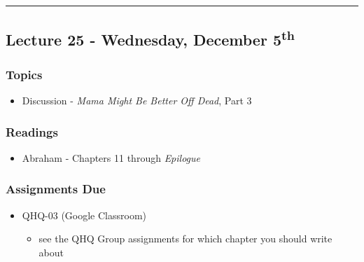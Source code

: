 \documentclass[]{book}
\providecommand{\tightlist}{%
  \setlength{\itemsep}{0pt}\setlength{\parskip}{0pt}}
\theoremstyle{definition}
\theoremstyle{definition}
\theoremstyle{definition}
\theoremstyle{remark}
\begin{document}
\begin{center}\rule{0.5\linewidth}{\linethickness}\end{center}

\hypertarget{lecture-25---wednesday-december-5th}{%
\subsection*{\texorpdfstring{Lecture 25 - Wednesday, December
5\textsuperscript{th}}{Lecture 25 - Wednesday, December 5th}}\label{lecture-25---wednesday-december-5th}}

\hypertarget{topics-29}{%
\subsubsection*{Topics}\label{topics-29}}

\begin{itemize}
\tightlist
\item
  Discussion - \emph{Mama Might Be Better Off Dead}, Part 3
\end{itemize}

\hypertarget{readings-27}{%
\subsubsection*{Readings}\label{readings-27}}

\begin{itemize}
\tightlist
\item
  Abraham - Chapters 11 through \emph{Epilogue}
\end{itemize}

\hypertarget{assignments-due-7}{%
\subsubsection*{Assignments Due}\label{assignments-due-7}}

\begin{itemize}
\tightlist
\item
  QHQ-03 (Google Classroom)

  \begin{itemize}
  \tightlist
  \item
    see the QHQ Group assignments for which chapter you should write
    about
  \end{itemize}
\end{itemize}
\end{document}
